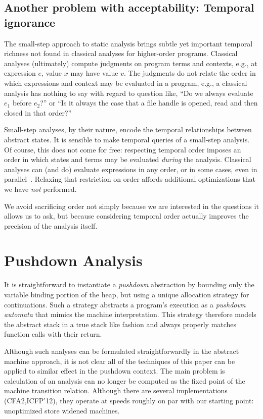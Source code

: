 \documentclass[preprint,onecolumn,9pt]{sigplanconf} %
\begin{document}
\subsection{Another problem with acceptability: Temporal ignorance}

The small-step approach to static analysis brings subtle yet important temporal
richness not found in classical analyses for higher-order programs.
%
Classical analyses (ultimately) compute judgments on program terms and
contexts, e.g., at expression $e$, value $x$ may have value $v$.
%
The judgments do not relate the order in which expressions and context may be
evaluated in a program, e.g., a classical analysis has nothing to say with
regard to question like, ``Do we always evaluate $e_1$ before $e_2$?'' or ``Is
it always the case that a file handle is opened, read and then closed in that
order?''

Small-step analyses, by their nature, encode the temporal relationships between
abstract states.
%
It is sensible to make temporal queries of a small-step analysis.
%
Of course, this does not come for free: respecting temporal order imposes an
order in which states and terms may be evaluated \emph{during} the analysis.
%
Classical analyses can (and do) evaluate expressions in any order, or in some
cases, even in parallel~\cite{might:Prabhu:2010:EigenCFA}.
%
Relaxing that restriction on order affords additional optimizations that we
have \emph{not} performed.

We avoid sacrificing order not simply because we are interested in the
questions it allows us to ask, but because considering temporal order actually
improves the precision of the analysis itself.



\section{Pushdown Analysis}

It is straightforward to instantiate a \emph{pushdown} abstraction by
bounding only the variable binding portion of the heap, but using a
unique allocation strategy for continuations.  Such a strategy
abstracts a program's execution as a \emph{pushdown automata}
that mimics the machine interpretation.  This strategy therefore
models the abstract stack in a true stack like fashion and always
properly matches function calls with their return.

Although such analyses can be formulated straightforwardly in the
abstract machine approach, it is not clear all of the techniques of
this paper can be applied to similar effect in the pushdown context.
The main problem is calculation of an analysis can no longer be
computed as the fixed point of the machine transition relation.
Although there are several implementations (CFA2,ICFP'12), they
operate at speeds roughly on par with our starting point: unoptimized
store widened
machines. \cite{dvanhorn:Earl2012Introspective,dvanhorn:Vardoulakis2011CFA2}
\end{document}
